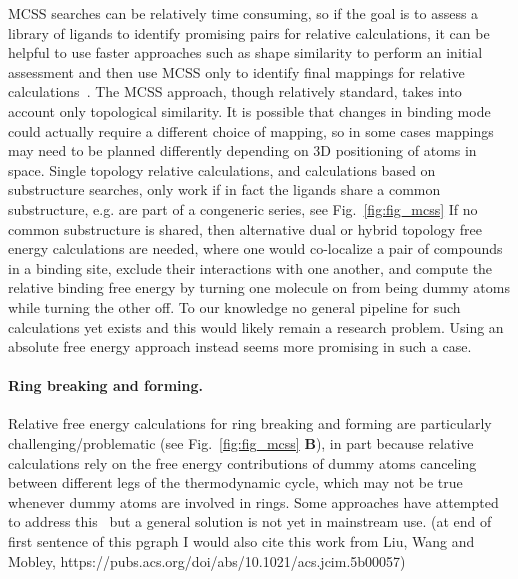 \documentclass[9pt,bestpractices]{livecoms}
\begin{document}
%
MCSS searches can be relatively time consuming, so if the goal is to assess a library of ligands to identify promising pairs for relative calculations, it can be helpful to use faster approaches such as shape similarity to perform an initial assessment and then use MCSS only to identify final mappings for relative calculations~\cite{raymond2002maximum,klabunde2012mars,jones2009elucidating}.
%
The MCSS approach, though relatively standard, takes into account only topological similarity. It is possible that changes in binding mode could actually require a different choice of mapping, so in some cases mappings may need to be planned differently depending on 3D positioning of atoms in space.
%
Single topology relative calculations, and calculations based on substructure searches, only work if in fact the ligands share a common substructure, e.g. are part of a congeneric series, see Fig.~\ref{fig:fig_mcss}
If no common substructure is shared, then alternative dual or hybrid topology free energy calculations are needed, where one would co-localize a pair of compounds in a binding site, exclude their interactions with one another, and compute the relative binding free energy by turning one molecule on from being dummy atoms while turning the other off.
To our knowledge no general pipeline for such calculations yet exists and this would likely remain a research problem. Using an absolute free energy approach  instead seems more promising in such a case. 
%
\paragraph{Ring breaking and forming.} Relative free energy calculations for ring breaking and forming are particularly challenging/problematic (see Fig.~\ref{fig:fig_mcss} \textbf{B}), in part because relative calculations rely on the free energy contributions of dummy atoms canceling between different legs of the thermodynamic cycle, which may not be true whenever dummy atoms are involved in rings.
Some approaches have attempted to address this~\cite{clark2019relative} but a general solution is not yet in mainstream use. (at end of first sentence of this pgraph I would also cite this work from Liu, Wang and Mobley, https://pubs.acs.org/doi/abs/10.1021/acs.jcim.5b00057)
%
\end{document}
